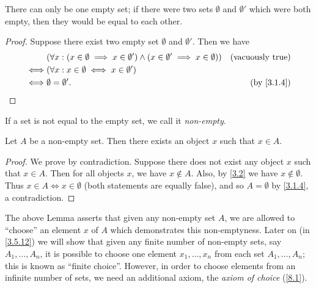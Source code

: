 \begin{ac}\label{ac:3.1.2}
  There can only be one empty set;
  if there were two sets \(\emptyset\) and \(\emptyset'\) which were both empty, then they would be equal to each other.
\end{ac}

\begin{proof}
  Suppose there exist two empty set \(\emptyset\) and \(\emptyset'\).
  Then we have
  \begin{align*}
         & (\forall x : (x \in \emptyset \implies x \in \emptyset') \land (x \in \emptyset' \implies x \in \emptyset)) & \text{(vacuously true)}  \\
    \iff & (\forall x : x \in \emptyset \iff x \in \emptyset')                                                                                    \\
    \iff & \emptyset = \emptyset'.                                                                                     & \text{(by \cref{3.1.4})}
  \end{align*}
\end{proof}

\begin{note}
  If a set is not equal to the empty set, we call it \emph{non-empty}.
\end{note}

\setcounter{thm}{5}
\begin{lem}\label{3.1.6}
  Let \(A\) be a non-empty set.
  Then there exists an object \(x\) such that \(x \in A\).
\end{lem}

\begin{proof}
  We prove by contradiction.
  Suppose there does not exist any object \(x\) such that \(x \in A\).
  Then for all objects \(x\), we have \(x \notin A\).
  Also, by \cref{3.2} we have \(x \notin \emptyset\).
  Thus \(x \in A \iff x \in \emptyset\) (both statements are equally false), and so \(A = \emptyset\) by \cref{3.1.4}, a contradiction.
\end{proof}

\begin{rmk}\label{3.1.7}
  The above Lemma asserts that given any non-empty set \(A\), we are allowed to ``choose'' an element \(x\) of \(A\) which demonstrates this non-emptyness.
  Later on (in \cref{3.5.12}) we will show that given any finite number of non-empty sets, say \(A_1, \dots, A_n\), it is possible to choose one element \(x_1, \dots, x_n\) from each set \(A_1, \dots, A_n\);
  this is known as ``finite choice''.
  However, in order to choose elements from an infinite number of sets, we need an additional axiom, the \emph{axiom of choice} (\cref{8.1}).
\end{rmk}

